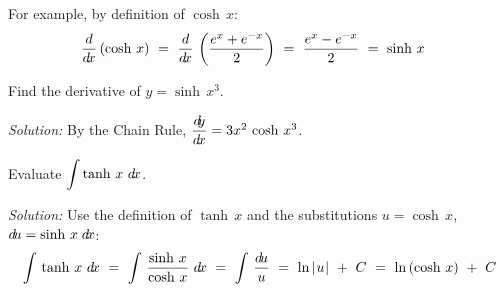 For example, by definition of $\cosh\,x$:
\[
\frac{d}{d\!x}\,(\cosh\,x) ~=~ \frac{d}{d\!x}\,\left(\frac{e^x + e^{-x}}{2}\right) ~=~
\frac{e^x - e^{-x}}{2} ~=~ \sinh\,x \quad\relax
\]

\begin{exmp}
\noindent Find the derivative of $y=\sinh\,x^3$.\vspace{1mm}
\par\noindent\emph{Solution:} By the Chain Rule, $\dfrac{d\negmedspace y}{d\!x} = 3x^2\,\cosh\,x^3$.
\end{exmp}
\begin{exmp}
\noindent Evaluate $\displaystyle\int\tanh\,x~d\!x$.\vspace{1mm}
\par\noindent\emph{Solution:} Use the definition of $\tanh\,x$ and the
substitutions $u=\cosh\,x$, $d\!u=\sinh\,x\;d\!x$:
\[
\int\,\tanh\,x~d\!x ~=~ \int\,\frac{\sinh\,x}{\cosh\,x}~d\!x ~=~
\int\,\frac{d\!u}{u} ~=~ \ln\,\lvert\mspace{1mu}u\mspace{1mu}\rvert ~+~ C ~=~ \ln\,(\cosh\,x) ~+~ C
\]
\end{exmp}
\divider
\vspace{2mm}

